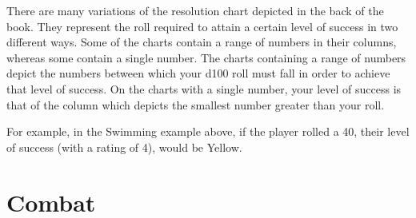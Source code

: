 \documentclass[oneside]{book}
\begin{document}
There are many variations of the resolution chart depicted in the back of the book. They represent the roll required to attain a certain level of success in two different ways. Some of the charts contain a range of numbers in their columns, whereas some contain a single number. The charts containing a range of numbers depict the numbers between which your d100 roll must fall in order to achieve that level of success. On the charts with a single number, your level of success is that of the column which depicts the smallest number greater than your roll. 

For example, in the Swimming example above, if the player rolled a 40, their level of success (with a rating of 4), would be Yellow.

\chapter{Combat}
\end{document}
